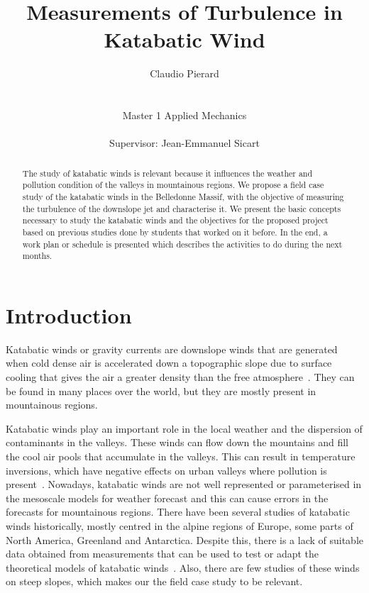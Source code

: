 \documentclass[a4paper,12pt]{article}
\title{Measurements of Turbulence in Katabatic Wind}
\author{Claudio Pierard \\
\\
\\
Master 1 Applied Mechanics\\
\\
Supervisor: Jean-Emmanuel Sicart}
\begin{document}
\renewcommand{\labelitemi}{$\bullet$}

\maketitle
\begin{abstract}
The study of katabatic winds is relevant because it influences the weather and pollution condition of the valleys in mountainous regions. We propose a field case study of the katabatic winds in the Belledonne Massif, with the objective of measuring the turbulence of the downslope jet and characterise it. We present the basic concepts necessary to study the katabatic winds and the objectives for the proposed project based on previous studies done by students that worked on it before. In the end, a work plan or schedule is presented which describes the activities to do during the next months.
   
\end{abstract}

\newpage

\tableofcontents

\newpage

\section{Introduction}

Katabatic winds or gravity currents are downslope winds that are generated when cold dense air is accelerated down a topographic slope due to surface cooling that gives the air a greater density than the free atmosphere~\citep{poulos2008observational}. They can be found in many places over the world, but they are mostly present in mountainous regions.

Katabatic winds play an important role in the local weather and the dispersion of contaminants in the valleys. These winds can flow down the mountains and fill the cool air pools that accumulate in the valleys. This can result in temperature inversions, which have negative effects on urban valleys where pollution is present~\citep{largeron2016persistent}. Nowadays, katabatic winds are not well represented or parameterised in the mesoscale models for weather forecast and this can cause errors in the forecasts for mountainous regions. There have been several studies of katabatic winds historically, mostly centred in the alpine regions of Europe, some parts of North America, Greenland and Antarctica. Despite this, there is a lack of suitable data obtained from measurements that can be used to test or adapt the theoretical models of katabatic winds~\citep{manins1979katabatic}. Also, there are few studies of these winds on steep slopes, which makes our the field case study to be relevant.
\end{document}
